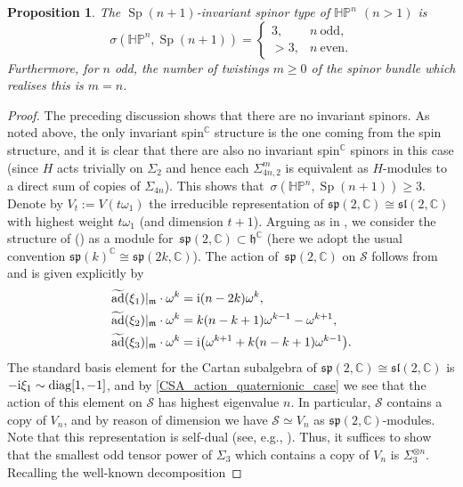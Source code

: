 \documentclass[pdftex]{sigma}
\numberwithin{equation}{section}
\newtheorem{Proposition}[Theorem]{Proposition}
{ \theoremstyle{definition}
	\newtheorem{Definition}[Theorem]{Definition}
	\newtheorem{Note}[Theorem]{Note}
	\newtheorem{Example}[Theorem]{Example}
	\newtheorem{Remark}[Theorem]{Remark} }
\newcommand{\C}{\mathbb{C}} %
\newcommand{\restr}[1]{|_{#1}}
\DeclareMathOperator{\ad}{ad}
\DeclareMathOperator{\Sp}{Sp}
\begin{document}
		\begin{Proposition} \label{HPn_twisting_type} The $\Sp(n+1)$-invariant spinor type of $\mathbb{HP}^n$ $(n>1)$ is
			\[ \sigma(\mathbb{HP}^n,\Sp(n+1)) = \begin{cases}
				3, & n \ \text{odd}, \\
				>3 ,& n \ \text{even}.
			\end{cases}
			\]
			Furthermore, for $n$ odd, the number of twistings $m \geq 0$ of the spinor bundle which realises this is $m=n$.
		\end{Proposition}
		\begin{proof}
			The preceding discussion shows that there are no invariant spinors. As noted above, the only invariant spin$^{\C}$ structure is the one coming from the spin structure, and it is clear that there are also no invariant spin$^{\C}$ spinors in this case (since $H$ acts trivially on $\Sigma_2$ and hence each $\Sigma_{4n,2}^{m}$ is equivalent as $H$-modules to a direct sum of copies of $\Sigma_{4n}$). This shows that~${\sigma(\mathbb{HP}^n, \Sp(n+1))\geq 3}$. Denote by $V_{t}:=V(t\omega_1)$ the irreducible representation of $\mathfrak{sp}(2,\C)\cong \mathfrak{sl}(2,\C)$ with highest weight $t\omega_1$ (and dimension $t+1$). Arguing as in \cite[Section~4.1.6]{AHL}, we consider the structure of \smash{$\mathcal{S}:=(\Sigma_{4n}\rvert_{\mathfrak{h}^{\C}})^{\mathfrak{sp}(2n,\C)} = \text{span}_{\C}\{ \omega^k\}_{k=0}^n$} () as a module for~${\mathfrak{sp}(2,\C)\subset \mathfrak{h}^{\C}}$ (here we adopt the usual convention $\mathfrak{sp}(k)^{\C} \cong \mathfrak{sp}(2k,\C)$). The action of~$\mathfrak{sp}(2,\C)$ on $\mathcal{S}$ follows from \cite[Lemma~5.13]{jordansasakian} and is given explicitly by
			\begin{align}
				&\widetilde{\ad}(\xi_1)\restr{\mathfrak{m}} \cdot \omega^k = {\rm i}(n-2k) \omega^k ,\label{CSA_action_quaternionic_case} \\
				&\widetilde{\ad}(\xi_2)\restr{\mathfrak{m}} \cdot \omega^k = k (n-k+1) \omega^{k-1} - \omega^{k+1} , \nonumber\\
				&\widetilde{\ad}(\xi_3)\restr{\mathfrak{m}} \cdot \omega^k = {\rm i} \bigl( \omega^{k+1} + k (n-k+1) \omega^{k-1} \bigr) .\label{xi3_action_quaternionic_case}
			\end{align}
			The standard basis element for the Cartan subalgebra of $\mathfrak{sp}(2,\C)\cong \mathfrak{sl}(2,\C)$ is $-{\rm i} \xi_1\sim \text{diag}[1,-1]$, and by \eqref{CSA_action_quaternionic_case} we see that the action of this element on $\mathcal{S}$ has highest eigenvalue $n$. In particular, $\mathcal{S}$ contains a copy of $V_n$, and by reason of dimension we have $\mathcal{S}\simeq V_n$ as $\mathfrak{sp}(2,\C)$-modules. Note that this representation is self-dual (see, e.g., \cite{Samelson}). Thus, it suffices to show that the smallest odd tensor power of $\Sigma_3$ which contains a copy of $V_n$ is $\Sigma_3^{\otimes n}$. Recalling the well-known decomposition

\end{proof}
\end{document}

